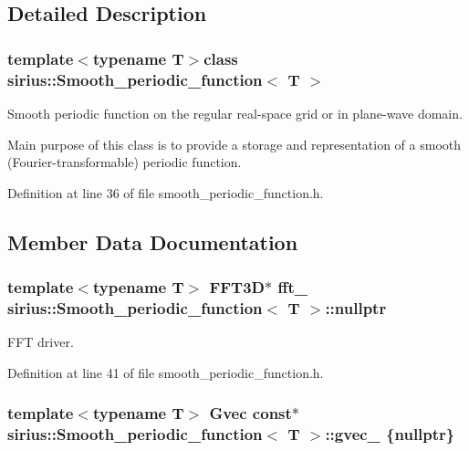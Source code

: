 \subsection{Detailed Description}
\subsubsection*{template$<$typename T$>$class sirius\+::\+Smooth\+\_\+periodic\+\_\+function$<$ T $>$}

Smooth periodic function on the regular real-\/space grid or in plane-\/wave domain. 

Main purpose of this class is to provide a storage and representation of a smooth (Fourier-\/transformable) periodic function. 

Definition at line 36 of file smooth\+\_\+periodic\+\_\+function.\+h.



\subsection{Member Data Documentation}
\hypertarget{classsirius_1_1_smooth__periodic__function_a12dde4e253178aa9cb2e00df22e9eac9}{}
\subsubsection[{nullptr}]{\setlength{\rightskip}{0pt plus 5cm}template$<$typename T$>$ F\+F\+T3\+D$\ast$ fft\+\_\+ {\bf sirius\+::\+Smooth\+\_\+periodic\+\_\+function}$<$ T $>$\+::nullptr\hspace{0.3cm}{\ttfamily [protected]}}\label{classsirius_1_1_smooth__periodic__function_a12dde4e253178aa9cb2e00df22e9eac9}


F\+F\+T driver. 



Definition at line 41 of file smooth\+\_\+periodic\+\_\+function.\+h.

\hypertarget{classsirius_1_1_smooth__periodic__function_a012ad2f87eaeadd3228e650bdd96c5fc}{}
\subsubsection[{gvec\+\_\+}]{\setlength{\rightskip}{0pt plus 5cm}template$<$typename T$>$ Gvec const$\ast$ {\bf sirius\+::\+Smooth\+\_\+periodic\+\_\+function}$<$ T $>$\+::gvec\+\_\+ \{{\bf nullptr}\}\hspace{0.3cm}{\ttfamily [protected]}}\label{classsirius_1_1_smooth__periodic__function_a012ad2f87eaeadd3228e650bdd96c5fc}


